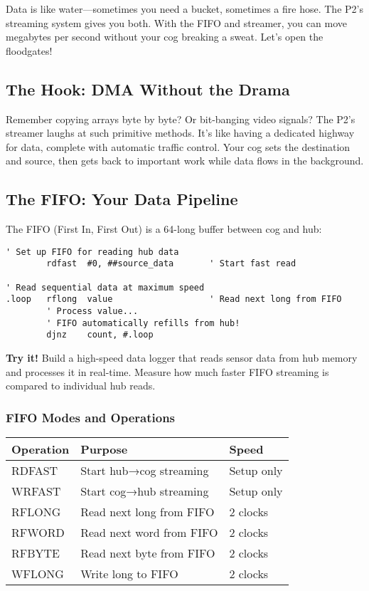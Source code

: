 \documentclass[11pt]{book}
\begin{document}
Data is like water---sometimes you need a bucket, sometimes a fire hose.
The P2's streaming system gives you both. With the FIFO and streamer,
you can move megabytes per second without your cog breaking a sweat.
Let's open the floodgates!

\hypertarget{the-hook-dma-without-the-drama}{%
\subsection{The Hook: DMA Without the
Drama}\label{the-hook-dma-without-the-drama}}

Remember copying arrays byte by byte? Or bit-banging video signals? The
P2's streamer laughs at such primitive methods. It's like having a
dedicated highway for data, complete with automatic traffic control.
Your cog sets the destination and source, then gets back to important
work while data flows in the background.

\hypertarget{the-fifo-your-data-pipeline}{%
\subsection{The FIFO: Your Data
Pipeline}\label{the-fifo-your-data-pipeline}}

The FIFO (First In, First Out) is a 64-long buffer between cog and hub:

\begin{lstlisting}
' Set up FIFO for reading hub data
        rdfast  #0, ##source_data       ' Start fast read
        
' Read sequential data at maximum speed
.loop   rflong  value                   ' Read next long from FIFO
        ' Process value...
        ' FIFO automatically refills from hub!
        djnz    count, #.loop
\end{lstlisting}

\textbf{Try it!} Build a high-speed data logger that reads sensor data
from hub memory and processes it in real-time. Measure how much faster
FIFO streaming is compared to individual hub reads.

\hypertarget{fifo-modes-and-operations}{%
\subsubsection{FIFO Modes and
Operations}\label{fifo-modes-and-operations}}

\begin{longtable}[]{@{}lll@{}}
\toprule
Operation & Purpose & Speed \\
\midrule
\endhead
RDFAST & Start hub→cog streaming & Setup only \\
WRFAST & Start cog→hub streaming & Setup only \\
RFLONG & Read next long from FIFO & 2 clocks \\
RFWORD & Read next word from FIFO & 2 clocks \\
RFBYTE & Read next byte from FIFO & 2 clocks \\
WFLONG & Write long to FIFO & 2 clocks \\
\bottomrule
\end{longtable}
\end{document}
